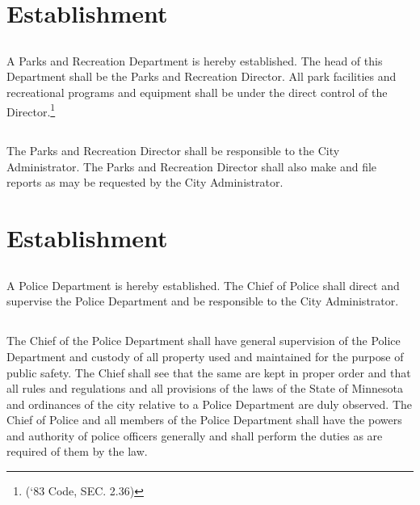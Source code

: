 \setcounter{section}{59}
\section{Establishment}
\subsection{}
A Parks and Recreation Department is hereby established. The head of this Department shall be the Parks and Recreation Director. All park facilities and recreational programs and equipment shall be under the direct control of the Director.\footnote{(‘83 Code, SEC. 2.36)}
\subsection{}
The Parks and Recreation Director shall be responsible to the City Administrator. The Parks and Recreation Director shall also make and file reports as may be requested by the City Administrator.\\

\setcounter{section}{69}
\section{Establishment}
\subsection{}
A Police Department is hereby established. The Chief of Police shall direct and supervise the Police Department and be responsible to the City Administrator.
\subsection{}
The Chief of the Police Department shall have general supervision of the Police Department and custody of all property used and maintained for the purpose of public safety.  The Chief shall see that the same are kept in proper order and that all rules and regulations and all provisions of the laws of the State of Minnesota and ordinances of the city relative to a Police Department are duly observed. The Chief of Police and all members of the Police Department shall have the powers and authority of police officers generally and shall perform the duties as are required of them by the law.
